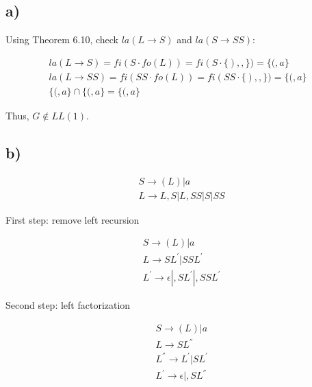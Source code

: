 \subsection*{a)}

Using Theorem 6.10, check $la(L \rightarrow S)$ and $la(S \rightarrow SS)$:

\begin{equation*}
\begin{split}
la(L \rightarrow S) = fi(S \cdot fo(L)) = fi(S \cdot \{), ,\}) = \{(, a\} \\
la(L \rightarrow SS) = fi(SS \cdot fo(L)) = fi(SS \cdot \{), ,\}) = \{(, a \} \\
\{(, a\} \cap \{(, a\} = \{(, a\}
\end{split}
\end{equation*}

Thus, $G \not\in LL(1)$.

\subsection*{b)}

\begin{equation*}
\begin{split}
&S \rightarrow (L) | a \\
&L \rightarrow L,S | L,SS | S | SS
\end{split}
\end{equation*}

First step: remove left recursion

\begin{equation*}
\begin{split}
&S \rightarrow (L) | a \\
&L \rightarrow SL^{'} | SSL^{'} \\
&L^{'} \rightarrow \epsilon | ,SL^{'} | ,SSL^{'}
\end{split}
\end{equation*}

Second step: left factorization

\begin{equation*}
\begin{split}
&S \rightarrow (L) | a \\
&L \rightarrow SL^{''} \\
&L^{''} \rightarrow L^{'} | SL^{'} \\
&L^{'} \rightarrow \epsilon | ,SL^{''}
\end{split}
\end{equation*}

